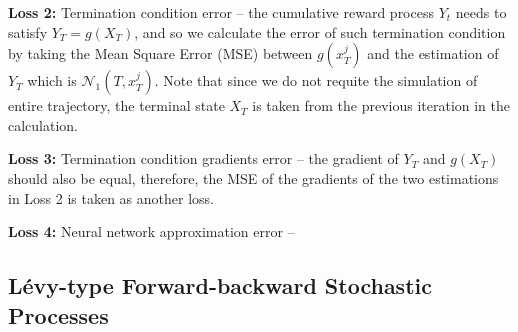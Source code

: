 \documentclass[12pt,letterpaper,oneside]{article}
\begin{document}
	\textbf{Loss 2: } Termination condition error -- the cumulative reward process $ Y_t $ needs to satisfy $ Y_T = g(X_T) $, and so we calculate the error of such termination condition by taking the Mean Square Error (MSE) between $ g(x_T^j) $ and the estimation of $ Y_T $ which is $ \mathcal{N}_1(T,x_T^j) $. Note that since we do not requite the simulation of entire trajectory, the terminal state $ X_T $ is taken from the previous iteration in the calculation. 
	
	\textbf{Loss 3: } Termination condition gradients error -- the gradient of $ Y_T $ and $ g(X_T) $ should also be equal, therefore, the MSE of the gradients of the two estimations in Loss 2 is taken as another loss.
	
	\textbf{Loss 4: } Neural network approximation error -- 
	
	
\subsection{L\'evy-type Forward-backward Stochastic Processes}
\end{document}
